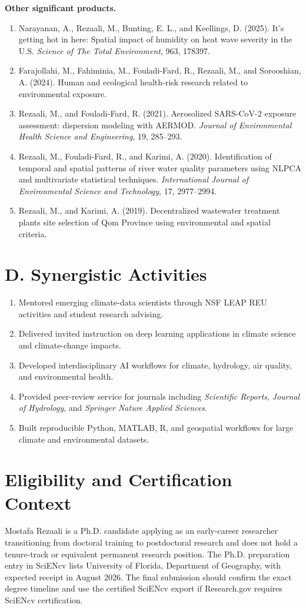 \documentclass[11pt,letterpaper]{article}
\begin{document}
\textbf{Other significant products.}
\begin{enumerate}
\item Narayanan, A., Rezaali, M., Bunting, E. L., and Keellings, D. (2025). It's getting hot in here: Spatial impact of humidity on heat wave severity in the U.S. \textit{Science of The Total Environment}, 963, 178397.
\item Farajollahi, M., Fahiminia, M., Fouladi-Fard, R., Rezaali, M., and Sorooshian, A. (2024). Human and ecological health-risk research related to environmental exposure.
\item Rezaali, M., and Fouladi-Fard, R. (2021). Aerosolized SARS-CoV-2 exposure assessment: dispersion modeling with AERMOD. \textit{Journal of Environmental Health Science and Engineering}, 19, 285--293.
\item Rezaali, M., Fouladi-Fard, R., and Karimi, A. (2020). Identification of temporal and spatial patterns of river water quality parameters using NLPCA and multivariate statistical techniques. \textit{International Journal of Environmental Science and Technology}, 17, 2977--2994.
\item Rezaali, M., and Karimi, A. (2019). Decentralized wastewater treatment plants site selection of Qom Province using environmental and spatial criteria.
\end{enumerate}

\section*{D. Synergistic Activities}
\begin{enumerate}
\item Mentored emerging climate-data scientists through NSF LEAP REU activities and student research advising.
\item Delivered invited instruction on deep learning applications in climate science and climate-change impacts.
\item Developed interdisciplinary AI workflows for climate, hydrology, air quality, and environmental health.
\item Provided peer-review service for journals including \textit{Scientific Reports}, \textit{Journal of Hydrology}, and \textit{Springer Nature Applied Sciences}.
\item Built reproducible Python, MATLAB, R, and geospatial workflows for large climate and environmental datasets.
\end{enumerate}

\section*{Eligibility and Certification Context}
Mostafa Rezaali is a Ph.D. candidate applying as an early-career researcher transitioning from doctoral training to postdoctoral research and does not hold a tenure-track or equivalent permanent research position. The Ph.D. preparation entry in SciENcv lists University of Florida, Department of Geography, with expected receipt in August 2026. The final submission should confirm the exact degree timeline and use the certified SciENcv export if Research.gov requires SciENcv certification.
\end{document}

